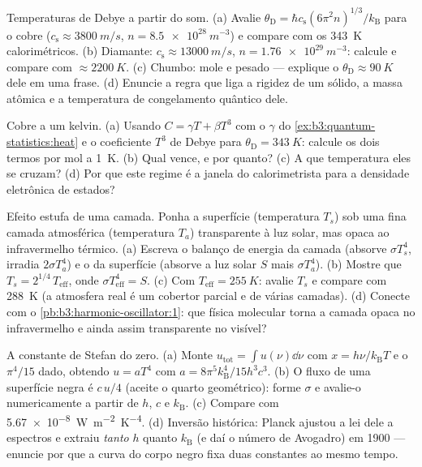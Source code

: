 \begin{exercise}[$\star\star$]\label{exo:b3:photons-phonons:7}
Temperaturas de Debye a partir do som. (a) Avalie $\theta_{\text{D}} =
\hbar c_{\text{s}}(6\pi^2n)^{1/3}/k_{\text{B}}$ para o cobre
($c_{\text{s}} \approx \qty{3800}{m/s}$, $n =
\qty{8.5e28}{m^{-3}}$) e compare com os \qty{343}{K}
calorimétricos. (b) Diamante: $c_{\text{s}} \approx
\qty{13000}{m/s}$, $n = \qty{1.76e29}{m^{-3}}$: calcule e
compare com $\approx\qty{2200}{K}$. (c) Chumbo: mole e pesado ---
explique o $\theta_{\text{D}} \approx \qty{90}{K}$ dele em uma
frase. (d) Enuncie a regra que liga a rigidez de um sólido, a
massa atômica e a temperatura de congelamento quântico dele.
\end{exercise}

\begin{exercise}[$\star\star$]\label{exo:b3:photons-phonons:8}
Cobre a um kelvin. (a) Usando $C = \gamma T + \beta T^3$ com
o $\gamma$ do \cref{ex:b3:quantum-statistics:heat} e o coeficiente
$T^3$ de Debye para $\theta_{\text{D}} = \qty{343}{K}$: calcule
os dois termos por mol a \qty{1}{K}. (b) Qual vence, e por quanto?
(c) A que temperatura eles se cruzam? (d) Por que este
regime é a janela do calorimetrista para a densidade eletrônica de
estados?
\end{exercise}

\begin{exercise}[$\star\star$]\label{exo:b3:photons-phonons:9}
Efeito estufa de uma camada. Ponha a superfície (temperatura $T_s$)
sob uma fina camada atmosférica (temperatura $T_a$) transparente
à luz solar, mas opaca ao infravermelho térmico. (a) Escreva o balanço
de energia da camada (absorve $\sigma T_s^4$, irradia
$2\sigma T_a^4$) e o da superfície (absorve a luz solar $S$ mais
$\sigma T_a^4$). (b) Mostre que $T_s = 2^{1/4}\,T_{\text{eff}}$, onde
$\sigma T_{\text{eff}}^4 = S$. (c) Com $T_{\text{eff}} =
\qty{255}{K}$: avalie $T_s$ e compare com \qty{288}{K}
(a atmosfera real é um cobertor parcial e de várias camadas). (d)
Conecte com o \cref{pb:b3:harmonic-oscillator:1}: que física
molecular torna a camada opaca no infravermelho e ainda assim
transparente no visível?
\end{exercise}

\begin{exercise}[$\star\star\star$]\label{exo:b3:photons-phonons:10}
A constante de Stefan do zero. (a) Monte $u_{\text{tot}} =
\int u(\nu)\dd\nu$ com $x = h\nu/k_{\text{B}}T$ e o
$\pi^4/15$ dado, obtendo $u = aT^4$ com $a =
8\pi^5k_{\text{B}}^4/15h^3c^3$. (b) O fluxo de uma
superfície negra é $c\,u/4$ (aceite o quarto geométrico): forme
$\sigma$ e avalie-o numericamente a partir de $h$, $c$ e
$k_{\text{B}}$. (c) Compare com \qty{5.67e-8}{W.m^{-2}.K^{-4}}.
(d) Inversão histórica: Planck ajustou a lei dele a espectros e
extraiu \emph{tanto} $h$ quanto $k_{\text{B}}$ (e daí o número de
Avogadro) em 1900 --- enuncie por que a curva do corpo negro fixa duas
constantes ao mesmo tempo.
\end{exercise}

